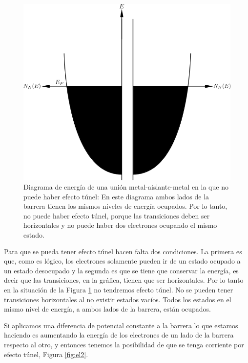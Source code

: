 \begin{figure}[H]
\centering \includegraphics[width=0.8\linewidth]{img/el1.png}
\caption[Diagrama de energía de una unión metal-aislante-metal en la que no puede haber efecto túnel]{Diagrama de energía de una unión metal-aislante-metal en la que no puede haber efecto túnel: En este diagrama ambos lados de la barrera tienen los mismos niveles de energía ocupados. Por lo tanto, no puede haber efecto túnel, porque las transiciones deben ser horizontales y no puede haber dos electrones ocupando el mismo estado.}
\label{fig:el1}
\end{figure}

Para que se pueda tener efecto túnel hacen falta dos condiciones. La primera es que, como es lógico, los electrones solamente pueden ir de un estado ocupado a un estado desocupado y la segunda es que se tiene que conservar la energía, es decir que las transiciones, en la gráfica, tienen que ser horizontales. Por lo tanto en la situación de la Figura \ref{fig:el1} no tendremos efecto túnel. No se pueden tener transiciones horizontales al no existir estados vacíos. Todos los estados en el mismo nivel de energía, a ambos lados de la barrera, están ocupados.

Si aplicamos una diferencia de potencial constante a la barrera lo que estamos haciendo es aumentando la energía de los electrones de un lado de la barrera respecto al otro, y entonces tenemos la posibilidad de que se tenga corriente por efecto túnel, Figura \ref{fig:el2}.

